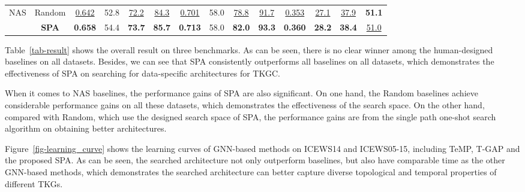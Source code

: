 \documentclass[11pt]{article}
\begin{document}
\begin{table*}[ht]
{\begin{tabular}{cccccccccccccc}
		\hline
		\multirow{2}{*}{NAS} & Random & \underline{0.642} &52.8    &\underline{72.2} &\underline{84.3}          &    \underline{0.701}          &58.0 & \underline{78.8}& \underline{91.7} & \underline{0.353} &\underline{27.1} & \underline{37.9} & \textbf{51.1}   \\
		& \textbf{SPA}   & \textbf{0.658} &54.4 &\textbf{73.7} &\textbf{85.7} & \textbf{0.713} & 58.0 & \textbf{82.0} & \textbf{93.3} &\textbf{0.360}	&\textbf{28.2} &\textbf{38.4}	&\underline{51.0}      \\
		\bottomrule
		
	\end{tabular}
	}
	\caption{Temporal KG completion evaluation results on ICEWS14, ICEWS05-15 and GDELT. 
	The H@1, H@3, and H@10 metrics are multiplied by 100. 
	Best results are in bold and the second best is underlined. 
	"-" means that results are not reported in those papers or their code on that data/metric is not available.} 
	\label{tab-result}
	\vspace{-10px}
\end{table*}

Table~\ref{tab-result} shows the overall result on three benchmarks.
As can be seen, there is no clear winner among the human-designed baselines on all datasets.
Besides, 
we can see that SPA consistently outperforms all baselines on all datasets, 
which demonstrates the effectiveness of SPA on searching for data-specific architectures for TKGC.

When it comes to NAS baselines, 
the performance gains of SPA are also significant. 
On one hand, 
the Random baselines achieve considerable performance gains on all these datasets, 
which demonstrates the effectiveness of the search space.
On the other hand, 
compared with Random, 
which use the designed search space of SPA, 
the performance gains are from the single path one-shot search algorithm on obtaining better architectures.

Figure~\ref{fig-learning_curve} shows the learning curves of GNN-based methods on ICEWS14 and ICEWS05-15, 
including TeMP, 
T-GAP and the proposed SPA.
As can be seen,
the searched architecture not only outperform baselines, 
but also have comparable time as the other GNN-based methods,
which demonstrates the searched architecture can better capture diverse topological and temporal properties of different TKGs.
\end{document}
